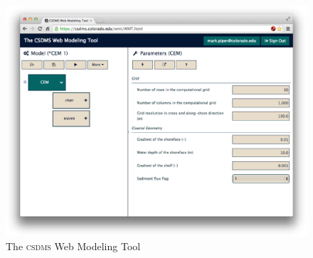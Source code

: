 \documentclass[11pt, oneside]{amsart}
\DeclareRobustCommand{\csdms}{\textsc{csdms}}
\begin{document}
\begin{figure}
  \caption{The \csdms{} Web Modeling Tool}
  \begin{center}
    \includegraphics[scale=.25]{wmt.eps}
  \end{center}
  \label{fig:wmt_screenshot}
\end{figure}

\end{document}
